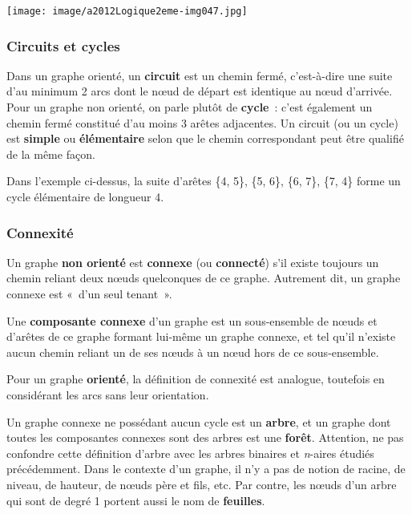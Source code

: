 			\begin{center}
			\texttt{[image: image/a2012Logique2eme-img047.jpg]}
			\end{center}
			
		\subsubsection{Circuits et cycles}
			
			Dans un graphe orienté, un \textbf{circuit} est un chemin fermé, 
			c'est-à-dire une suite d'au minimum 2 arcs dont le n{\oe}ud de 
			départ est identique au n{\oe}ud d'arrivée. Pour un graphe non 
			orienté, on parle plutôt de \textbf{cycle}~:
			c'est également un chemin fermé constitué d'au moins 3 arêtes 
			adjacentes. Un circuit (ou un cycle) est \textbf{simple}
			ou \textbf{élémentaire} selon que le chemin correspondant 
			peut être qualifié de la même façon.

			Dans l'exemple ci-dessus, la suite d'arêtes 
			\{4, 5\}, \{5, 6\}, \{6, 7\}, \{7, 4\} 
			forme un cycle élémentaire de	longueur 4.

		\subsubsection{Connexité}
		
		Un graphe \textbf{non orienté} est \textbf{connexe} 
		(ou \textbf{connecté}) s'il existe toujours un chemin 
		reliant deux n{\oe}uds quelconques de ce graphe. 
		Autrement dit, un graphe connexe est «~d'un seul tenant~».

		Une \textbf{composante connexe} d'un graphe est un sous-ensemble 
		de n{\oe}uds et d'arêtes de ce graphe formant lui-même
		un graphe connexe, et tel qu'il n'existe aucun chemin reliant 
		un de ses n{\oe}uds à un n{\oe}ud hors de ce sous-ensemble.

		Pour un graphe \textbf{orienté}, la définition de connexité est 
		analogue, toutefois en considérant les arcs sans leur orientation.

		Un graphe connexe ne possédant aucun cycle est un \textbf{arbre}, 
		et un graphe dont toutes les composantes connexes sont des arbres 
		est une \textbf{forêt}. Attention, ne pas confondre cette 
		définition d'arbre avec les arbres binaires et \textit{n}-aires 
		étudiés précédemment. Dans le contexte d'un graphe, il n'y a pas 
		de notion de racine, de niveau, de hauteur, de n{\oe}uds père et fils, etc. 
		Par contre, les n{\oe}uds d'un arbre qui sont de degré 1 portent aussi le
		nom de \textbf{feuilles}.

